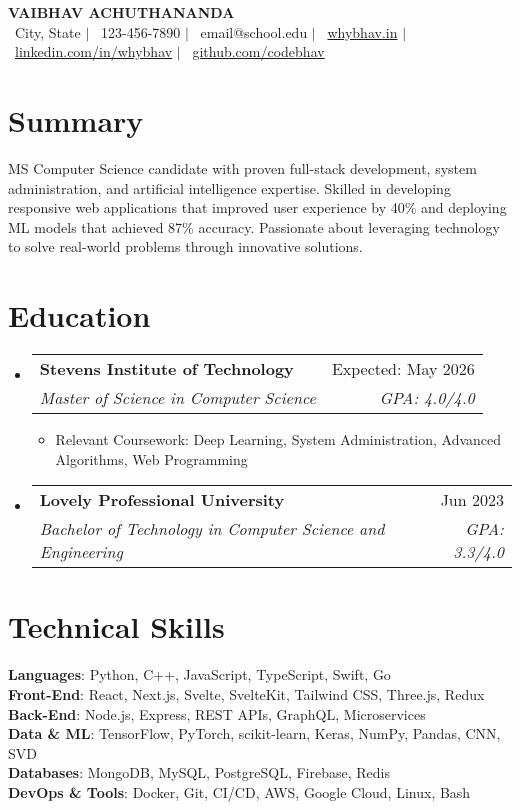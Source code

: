 \documentclass[letterpaper,11pt]{article}
\makeatletter
\newcommand{\resumeItem}[1]{
  \item\small{
    {#1 \vspace{-1pt}}
  }
}
\newcommand{\resumeSubheading}[4]{
  \vspace{-2pt}\item
    \begin{tabular*}{0.97\textwidth}[t]{l@{\extracolsep{\fill}}r}
      \textbf{#1} & #2 \\
      \textit{\small#3} & \textit{\small #4} \\
    \end{tabular*}\vspace{-7pt}
}
\newcommand{\resumeSubHeadingListStart}{\begin{itemize}[leftmargin=0.15in, label={}]}
\newcommand{\resumeSubHeadingListEnd}{\end{itemize}}
\newcommand{\resumeItemListStart}{\begin{itemize}}
\newcommand{\resumeItemListEnd}{\end{itemize}\vspace{-5pt}}
\makeatother
\begin{document}
\begin{center}
    \textbf{\Huge \color{mitred}VAIBHAV ACHUTHANANDA} \\ \vspace{3pt}
    \small 
    \faMapMarker*\ City, State $|$ 
    \faMobile*\ 123-456-7890 $|$ 
    \faEnvelope\ email@school.edu $|$ 
    \faGlobe\ \href{https://whybhav.in/}{whybhav.in} $|$
    \faLinkedin\ \href{https://www.linkedin.com/in/whybhav}{linkedin.com/in/whybhav} $|$
    \faGithub\ \href{https://github.com/codebhav}{github.com/codebhav}
\end{center}

\section{Summary}
\small{
MS Computer Science candidate with proven full-stack development, system administration, and artificial intelligence expertise. Skilled in developing responsive web applications that improved user experience by 40\% and deploying ML models that achieved 87\%
accuracy. Passionate about leveraging technology to solve real-world problems through innovative solutions.
}

\section{Education}
  \resumeSubHeadingListStart
    \resumeSubheading
      {Stevens Institute of Technology}{Expected: May 2026}
      {Master of Science in Computer Science}{GPA: 4.0/4.0}
      \resumeItemListStart
        \resumeItem{Relevant Coursework: Deep Learning, System Administration, Advanced Algorithms, Web Programming}
      \resumeItemListEnd
      
    \resumeSubheading
      {Lovely Professional University}{Jun 2023}
      {Bachelor of Technology in Computer Science and Engineering}{GPA: 3.3/4.0}
  \resumeSubHeadingListEnd

\section{Technical Skills}
  \begin{itemize}[leftmargin=0.15in, label={}]
    \small{\item{
      \textbf{Languages}{: Python, C++, JavaScript, TypeScript, Swift, Go} \\
      \textbf{Front-End}{: React, Next.js, Svelte, SvelteKit, Tailwind CSS, Three.js, Redux} \\
      \textbf{Back-End}{: Node.js, Express, REST APIs, GraphQL, Microservices} \\
      \textbf{Data \& ML}{: TensorFlow, PyTorch, scikit-learn, Keras, NumPy, Pandas, CNN, SVD} \\
      \textbf{Databases}{: MongoDB, MySQL, PostgreSQL, Firebase, Redis} \\
      \textbf{DevOps \& Tools}{: Docker, Git, CI/CD, AWS, Google Cloud, Linux, Bash} \\
    }}
  \end{itemize}
\end{document}
